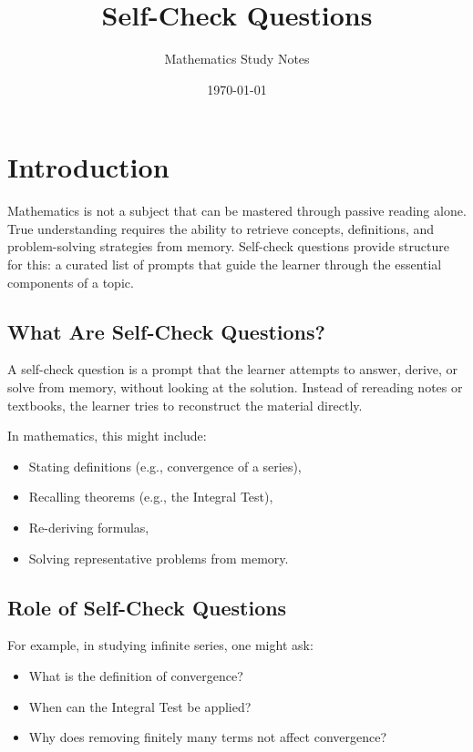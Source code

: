 \documentclass{article}
\title{Self-Check Questions}
\author{Mathematics Study Notes}
\date{\today}
\begin{document}
\maketitle

\section{Introduction}

Mathematics is not a subject that can be mastered through passive reading alone. True understanding requires the ability to retrieve concepts, definitions, and problem-solving strategies from memory. Self-check questions provide structure for this: a curated list of prompts that guide the learner through the essential components of a topic.

\subsection{What Are Self-Check Questions?}

A self-check question is a prompt that the learner attempts to answer, derive, or solve from memory, without looking at the solution. Instead of rereading notes or textbooks, the learner tries to reconstruct the material directly.

In mathematics, this might include:
\begin{itemize}
  \item Stating definitions (e.g., convergence of a series),
  \item Recalling theorems (e.g., the Integral Test),
  \item Re-deriving formulas,
  \item Solving representative problems from memory.
\end{itemize}

\subsection{Role of Self-Check Questions}

For example, in studying infinite series, one might ask:
\begin{itemize}
  \item What is the definition of convergence?
  \item When can the Integral Test be applied?
  \item Why does removing finitely many terms not affect convergence?
\end{itemize}
\end{document}
